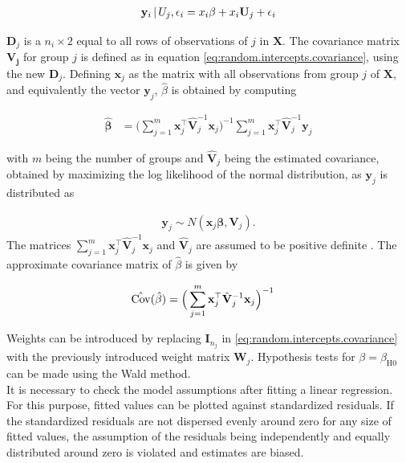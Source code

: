 \documentclass[11pt,a4paper,twoside]{book}\usepackage[]{graphicx}\usepackage[]{color}
\begin{document}
\begin{align}
\mathbf{y}_i \,\vert\, U_j,\epsilon_i =  x_i\beta + x_i \mathbf{U}_j + \epsilon_i \label{eq:one.random.intercept.and.slope}
\end{align}

$\mathbf{D}_j$ is a $n_i \times 2$ equal to all rows of observations of $j$ in $\mathbf{X}$. The covariance matrix $\mathbf{V_j}$ for group $j$ is defined as in equation \eqref{eq:random.intercepts.covariance}, using the new $\mathbf{D}_j$. Defining $\mathbf{x}_j$ as the matrix with all observations from group $j$ of $\mathbf{X}$, and equivalently the vector $\mathbf{y}_j$, $\hat{\beta}$ is obtained by computing

\begin{align}
\hat{\mathbf{\beta}} &= \Big( \sum_{j = 1}^m \mathbf{x}_j^\top \hat{\mathbf{V}}_j^{-1} \mathbf{x}_j \Big)^{-1} \sum_{j = 1}^m \mathbf{x}_j^\top \hat{\mathbf{V}}_j^{-1} \mathbf{y}_j
\end{align}

with $m$ being the number of groups and $\hat{\mathbf{V}}_j$ being the estimated covariance, obtained by maximizing the log likelihood of the normal distribution, as $\mathbf{y}_j$ is distributed as

\begin{align}
\mathbf{y}_j \sim N(\mathbf{x}_j \mathbf{\beta}, \mathbf{V}_j).
\end{align}
The matrices $\sum_{j = 1}^m \mathbf{x}_j^\top \hat{\mathbf{V}}_j^{-1} \mathbf{x}_j$ and $\hat{\mathbf{V}}_j$ are assumed to be positive definite  . The approximate covariance matrix of $\hat{\beta}$ is given by

\begin{align}
\hat{\operatorname{Cov}}(\hat{\beta}) &= \Big( \sum_{j = 1}^m \mathbf{x}_j^\top \hat{\mathbf{V}}_j^{-1} \mathbf{x}_j \Big)^{-1}
\end{align}

Weights can be introduced by replacing $\mathbf{I}_{n_j}$ in \eqref{eq:random.intercepts.covariance} with the previously introduced weight matrix $\mathbf{W}_j$. Hypothesis tests for $\beta = \beta_\textrm{H0}$ can be made using the Wald method. \\
It is necessary to check the model assumptions after fitting a linear regression. For this purpose, fitted values can be plotted against standardized residuals. If the standardized residuals are not dispersed evenly around zero for any size of fitted values, the assumption of the residuals being independently and equally distributed around zero is violated and estimates are biased. \\
\end{document}
